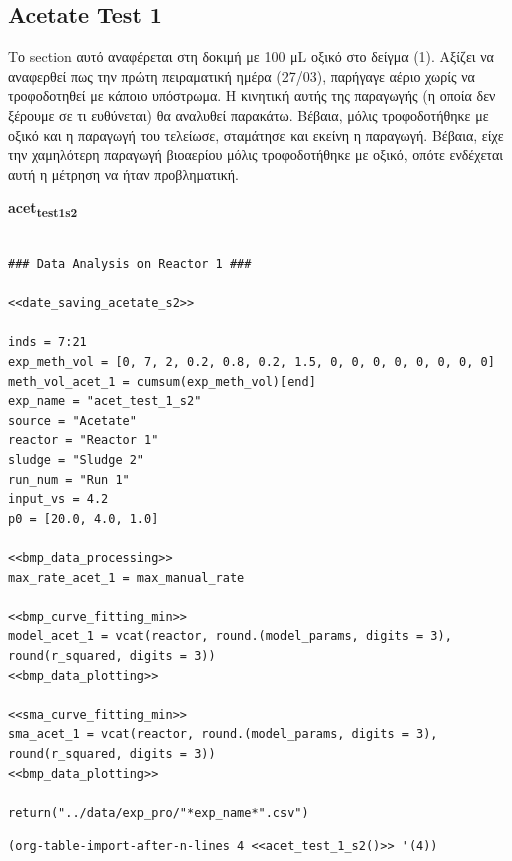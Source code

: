 \documentclass[11pt]{article}
\begin{document}
\subsection{Acetate Test 1}
\label{sec:org1d6591c}
Το section αυτό αναφέρεται στη δοκιμή με 100 μL οξικό στο δείγμα (1). Aξίζει να αναφερθεί πως την πρώτη πειραματική ημέρα (27/03), παρήγαγε αέριο χωρίς να τροφοδοτηθεί με κάποιο υπόστρωμα. Η κινητική αυτής της παραγωγής (η οποία δεν ξέρουμε σε τι ευθύνεται) θα αναλυθεί παρακάτω. Βέβαια, μόλις τροφοδοτήθηκε με οξικό και η παραγωγή του τελείωσε, σταμάτησε και εκείνη η παραγωγή. Βέβαια, είχε την χαμηλότερη παραγωγή βιοαερίου μόλις τροφοδοτήθηκε με οξικό, οπότε ενδέχεται αυτή η μέτρηση να ήταν προβληματική.

\textbf{acet\textsubscript{test}\textsubscript{1}\textsubscript{s2}}
\begin{verbatim}

### Data Analysis on Reactor 1 ###

<<date_saving_acetate_s2>>

inds = 7:21
exp_meth_vol = [0, 7, 2, 0.2, 0.8, 0.2, 1.5, 0, 0, 0, 0, 0, 0, 0, 0]
meth_vol_acet_1 = cumsum(exp_meth_vol)[end]
exp_name = "acet_test_1_s2"
source = "Acetate"
reactor = "Reactor 1"
sludge = "Sludge 2"
run_num = "Run 1"
input_vs = 4.2
p0 = [20.0, 4.0, 1.0]

<<bmp_data_processing>>
max_rate_acet_1 = max_manual_rate

<<bmp_curve_fitting_min>>
model_acet_1 = vcat(reactor, round.(model_params, digits = 3), round(r_squared, digits = 3))
<<bmp_data_plotting>>

<<sma_curve_fitting_min>>
sma_acet_1 = vcat(reactor, round.(model_params, digits = 3), round(r_squared, digits = 3))  
<<bmp_data_plotting>>

return("../data/exp_pro/"*exp_name*".csv")
\end{verbatim}

\begin{verbatim}
(org-table-import-after-n-lines 4 <<acet_test_1_s2()>> '(4))
\end{verbatim}
\end{document}
